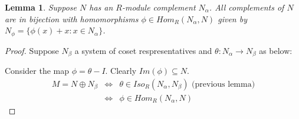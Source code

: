 \documentclass{sig-alternate}
\newtheorem{lemma}[theorem]{Lemma}
\begin{document}
\begin{lemma}
Suppose $N$ has an $R$-module complement $N_{\alpha}$. All complements of $N$ are in bijection with homomorphisms $\phi\in Hom_R(N_{\alpha}, N)$ given by $N_{\phi} = \{ \phi(x) +  x : x \in N_{\alpha} \}$.
\end{lemma}
\begin{proof}
Suppose $N_{\beta}$ a system of coset respresentatives and $\theta:N_{\alpha}\rightarrow N_{\beta}$ as below:
\begin{center}
\end{center}
Consider the map $\phi = \theta - I$. Clearly $Im(\phi) \subseteq N$.
\begin{eqnarray*}
M = N \oplus N_{\beta} & \Longleftrightarrow & \theta \in Iso_R(N_{\alpha}, N_{\beta})  \mbox{ (previous lemma)}\\
 & \Longleftrightarrow & \phi \in Hom_R(N_{\alpha}, N)
 \end{eqnarray*} 
\end{proof}
\end{document}
